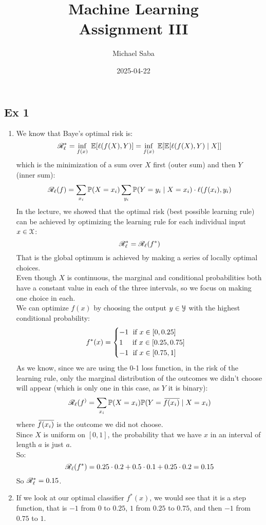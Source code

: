 \documentclass[12pt]{article}
\title{%
    \Huge Machine Learning \\
    \Large Assignment III
}
\date{2025-04-22}
\author{Michael Saba}
\begin{document}
\maketitle
\newpage
\setlength{\parindent}{0pt}

\subsection*{Ex 1}
\begin{enumerate}[label = \alph*)]
\item 
We know that Baye's optimal risk is:
\[ \mathscr{R}_\ell^*
= \inf_{f(x)} \; \mathbb{E}[\ell(f(X), Y)] 
= \inf_{f(x)} \; 
\mathbb{E}[\mathbb{E}[\ell(f(X), Y) \mid X]] \]
which is the minimization of 
a sum over $X$ first (outer sum)
and then $Y$ (inner sum):
\[ \mathscr{R}_\ell(f)
= \sum_{x_i} \mathbb{P}(X = x_i)
\sum_{y_i} \mathbb{P}(Y = y_i \mid X = x_i)
\cdot \ell(f(x_i), y_i) \]
In the lecture, we showed that the
optimal risk (best possible learning rule)
can be achieved by optimizing the
learning rule for each individual
input $x \in \mathcal{X}$:
\[ \mathscr{R}_\ell^* = \mathscr{R}_\ell(f^*) \]
That is
the global optimum is achieved
by making a series of locally optimal
choices. \\
Even though $X$ is continuous,
the marginal and conditional probabilities
both have a constant value in each
of the three intervals,
so we focus on making one choice in each. \\
We can optimize $f(x)$
by choosing the output $y \in \mathcal{Y}$
with the highest conditional
probability:
\[ f^*(x)
= \begin{cases} -1 \; \text{ if } x \in [0, 0.25] \\ 1 \quad \text{ if } x \in [0.25, 0.75] \\ -1 \; \text{ if } x \in [0.75, 1] \end{cases} \]
As we know,
since we are using the 0-1 loss function,
in the risk of the learning rule,
only the marginal distribution
of the outcomes we didn't choose
will appear (which is only
one in this case, as $Y$ it is binary):
\[ \mathscr{R}_\ell(f^)
= \sum_{x_i} \mathbb{P}(X = x_i)
\mathbb{P}(Y = \,\overline{\!{f(x_i)}} \mid X = x_i) \]
where $\,\overline{\!{f(x_i)}}$
is the outcome we did not choose. \\
Since $X$ is uniform on $[0, 1]$,
the probability that we have
$x$ in an interval of length $a$
is just $a$. \\
So:
\[ \mathscr{R}_\ell(f^*) = 
0.25 \cdot 0.2 + 0.5 \cdot 0.1
+ 0.25 \cdot 0.2 = 0.15 \]
So $\mathscr{R}_\ell^* = 0.15$.
\item 
If we look at our optimal classifier 
$f^*(x)$, we would see that it is
a step function, that is $-1$
from $0$ to $0.25$,
$1$ from $0.25$ to $0.75$,
and then $-1$ from $0.75$ to $1$. \\

\end{enumerate}
\end{document}
